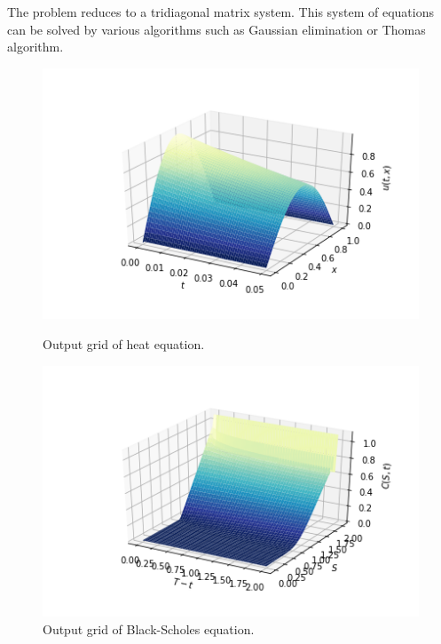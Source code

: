 \documentclass[12pt, oneside]{book}
\theoremstyle{plain}
\theoremstyle{definition}
\begin{document}
The problem reduces to a tridiagonal matrix system. This system of equations can be solved by various algorithms such as Gaussian elimination or Thomas algorithm.

\begin{figure}[!htb]
  \begin{minipage}[b]{0.5\textwidth}
    \includegraphics[width=\textwidth]{HeatCNGrid.png}
    \caption{Output grid of heat equation.}
  \end{minipage}
  \begin{minipage}[b]{0.5\textwidth}
    \includegraphics[width=\textwidth]{BSCNGrid.png}
    \caption{Output grid of Black-Scholes equation.}
  \end{minipage}
\end{figure}
\end{document}
